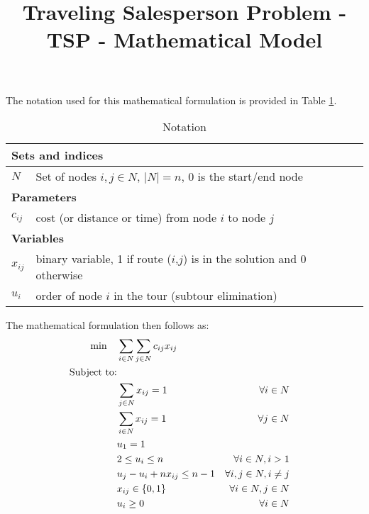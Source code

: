 \documentclass[11pt,a4paper]{article}
\begin{document}
\title{\Large{Traveling Salesperson Problem - TSP - Mathematical Model }}
\date{}
\maketitle
\vspace{-0.5cm}
The notation used for this mathematical formulation is provided in Table \ref{tab:notation}. \vspace{-0.5cm} 
\begin{table}[h]
\caption{Notation} 
\centering
\label{tab:notation}
\begin{tabular}{lll}
\toprule
\multicolumn{2}{l}{\textbf{Sets and indices}} \\
\midrule							
$N$     & Set of nodes $i,j \in N$, $	\lvert N \rvert = n$, $0$ is the start/end node  \\
\midrule
\multicolumn{2}{l}{\textbf{Parameters}}   \\
\midrule
$c_{ij}$     & cost (or distance or time) from node $i$ to node $j$ \\
\midrule
\multicolumn{2}{l}{\textbf{Variables}}    \\ 
\midrule
$x_{ij}$    & binary variable, 1 if  route ($i$,$j$) is in the solution and 0 otherwise  \\
$u_i$  & order of node $i$ in the tour (subtour elimination) \\
\bottomrule 
\end{tabular}
\end{table}

The mathematical formulation then follows as: 
\begin{align}
\min \quad & \sum_{i \in N} \sum_{j \in N} c_{ij} x_{ij}\label{obj} &\\
\notag
\text{Subject to:} & &\\
& \sum_{j \in N} x_{ij} = 1 &\forall i \in N \label{outgoing} & \\
& \sum_{i \in N} x_{ij} = 1 &\forall j \in N \label{incoming} &\\
& u_1 = 1 \label{start_order} & &\\
& 2 \leq u_i \leq n & \forall i \in N, i>1 \label{order_range}& \\
& u_j - u_i + n x_{ij} \leq n - 1 & \forall i,j \in N, i \neq j \label{subtour_elimination} &\\
& x_{ij} \in \{0,1\} & \forall i \in N, j \in N \label{x_var} &\\
& u_i \geq 0 & \forall i \in N \label{u_var} &
\end{align}
\end{document}
